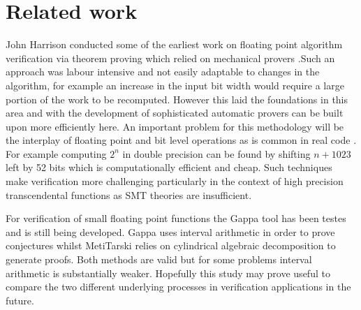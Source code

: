 \documentclass[a4]{article}
\begin{document}
\section{Related work}
John Harrison conducted some of the earliest work on floating point algorithm verification via theorem proving which relied on mechanical provers \cite{harrison1997floating}.Such an approach was labour intensive and not easily adaptable to changes in the algorithm, for example an increase in the input bit width would require a large portion of the work to be recomputed. However this laid the foundations in this area and with the development of sophisticated automatic provers can be built upon more efficiently here. An important problem for this methodology will be the interplay of floating point and bit level operations as is common in real code \cite{mine2012abstract}. For example computing $2^n$ in double precision can be found by shifting $n+1023$ left by 52 bits which is computationally efficient and cheap. Such techniques make verification more challenging particularly in the context of high precision transcendental functions \cite{lee2016verifying} as SMT theories are insufficient. 

For verification of small floating point functions the Gappa tool \cite{de2006assisted,boldo2009combining} has been testes and is still being developed. Gappa uses interval arithmetic in order to prove conjectures whilst MetiTarski relies on cylindrical algebraic decomposition to generate proofs. Both methods are valid but for some problems interval arithmetic is substantially weaker. Hopefully this study may prove useful to compare the two different underlying processes in verification applications in the future.
\end{document}
